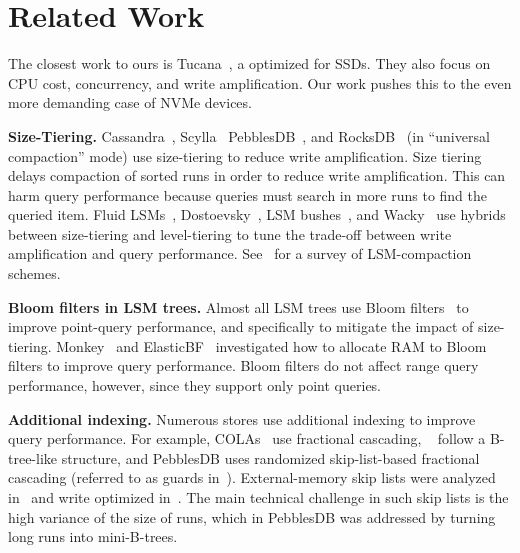 \section{Related Work}
\label{sec:related}

The closest work to ours is Tucana~\cite{PapagiannisSaGo16}, a \bet
optimized for SSDs.  They also focus on CPU cost, concurrency, and
write amplification.  Our work pushes this to the even more demanding
case of NVMe devices.  

\textbf{Size-Tiering.}  Cassandra~\cite{cassandra}, Scylla~\cite{scylla}
PebblesDB~\cite{!pebblesdb:raju}, and RocksDB~\cite{facebook-rocksdb2018} (in
``universal compaction'' mode) use size-tiering to reduce write amplification.
Size tiering delays compaction of sorted runs in order to reduce
write amplification.  This can harm query performance because queries must
search in more runs to find the queried item.  Fluid
LSMs~\cite{!dostoevsky:dayan:idreos},
Dostoevsky~\cite{!dostoevsky:dayan:idreos}, LSM
bushes~\cite{!log:structured:merge:bush}, and
Wacky~\cite{!log:structured:merge:bush} use hybrids between size-tiering and
level-tiering to tune the trade-off between write amplification and query
performance.  See~\cite{!pebblesdb:raju} for a survey of LSM-compaction
schemes.

\textbf{Bloom filters in LSM trees.}  Almost all LSM trees use Bloom
filters~\cite{DBLP:journals/cacm/Bloom70} to improve point-query
performance, and specifically to mitigate the impact of size-tiering.
Monkey~\cite{!monkey:optimal:navigable} and ElasticBF~\cite{elasticbf}
investigated how to allocate RAM to Bloom filters to improve query
performance.  Bloom filters do not affect range query performance,
however, since they support only point queries.

\textbf{Additional indexing.}  Numerous \kv stores use additional
indexing to improve query performance.  For example,
COLAs~\cite{!bender:streaming:oblivious} use fractional cascading,
\bets~\cite{DBLP:conf/soda/BrodalF03} follow a B-tree-like structure,
and PebblesDB uses randomized skip-list-based fractional cascading
(referred to as guards in~\cite{!pebblesdb:raju}).
External-memory skip lists
were analyzed in~\cite{!bender:persistence} and write optimized
in~\cite{!bender:skip}.  The main technical challenge in such skip
lists is the high variance of the size of runs, which in PebblesDB was
addressed by turning long runs into mini-B-trees.


